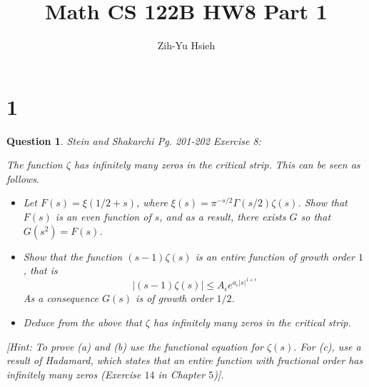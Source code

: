 \documentclass{article}
\title{Math CS 122B HW8 Part 1}
\author{Zih-Yu Hsieh}
\newtheorem{question}{Question}
\begin{document}
\maketitle

\section*{1}
\begin{myBox}[]{}
    \begin{question}
        Stein and Shakarchi Pg. 201-202 Exercise 8:

        The function $\zeta$ has infinitely many zeros in the critical strip. This can be seen as follows.
        \begin{itemize}
            \item[(a)] Let $F(s)=\xi(1/2+s)$, where $\xi(s)=\pi^{-s/2}\Gamma(s/2)\zeta(s)$. 
            Show that $F(s)$ is an even function of $s$, and as a result, there exists $G$ so that $G(s^2)=F(s)$.
            \item[(b)] Show that the function $(s-1)\zeta(s)$ is an entire function of growth order $1$, that is 
            $$|(s-1)\zeta(s)|\leq A_\epsilon e^{a_\epsilon |s|^{1+\epsilon}}$$
            As a consequence $G(s)$ is of growth order $1/2$.
            \item[(c)] Deduce from the above that $\zeta$ has infinitely many zeros in the critical strip.
        \end{itemize}
        [Hint: To prove (a) and (b) use the functional equation for $\zeta(s)$. For (c), use a result of Hadamard, which states that an entire function with fractional order has infinitely many zeros (Exercise $14$ in Chapter $5$)].
    \end{question}
\end{myBox}
\end{document}
